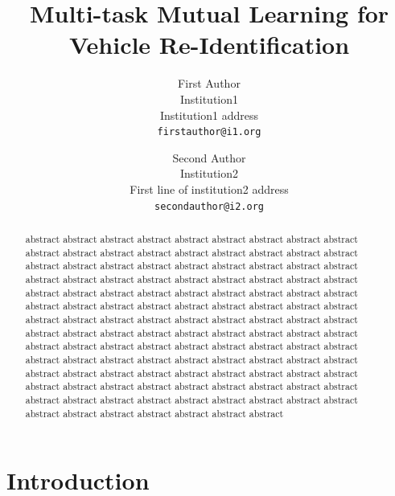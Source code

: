 \documentclass[10pt,twocolumn,letterpaper]{article}
\begin{document}
\title{Multi-task Mutual Learning for Vehicle Re-Identification}

\author{First Author\\
Institution1\\
Institution1 address\\
{\tt\small firstauthor@i1.org}
\and
Second Author\\
Institution2\\
First line of institution2 address\\
{\tt\small secondauthor@i2.org}
}

\maketitle

\begin{abstract}
  abstract  abstract  abstract  abstract  abstract  abstract  abstract  abstract  abstract  abstract  abstract  abstract  abstract  abstract  abstract  abstract  abstract  abstract  abstract  abstract  abstract  abstract  abstract  abstract  abstract  abstract  abstract  abstract  abstract  abstract  abstract  abstract  abstract  abstract  abstract  abstract  abstract  abstract  abstract  abstract  abstract  abstract  abstract  abstract  abstract  abstract  abstract  abstract  abstract  abstract  abstract  abstract  abstract  abstract  abstract  abstract  abstract  abstract  abstract  abstract  abstract  abstract  abstract  abstract  abstract  abstract  abstract  abstract  abstract  abstract  abstract  abstract  abstract  abstract  abstract  abstract  abstract  abstract  abstract  abstract  abstract  abstract  abstract  abstract  abstract  abstract  abstract  abstract  abstract  abstract  abstract  abstract  abstract  abstract  abstract  abstract  abstract  abstract  abstract  abstract  abstract  abstract  abstract  abstract  abstract  abstract  abstract  abstract  abstract  abstract  abstract  abstract  abstract  abstract  abstract  abstract  abstract  abstract  abstract  abstract  abstract  abstract  abstract  abstract
\end{abstract}

\section{Introduction}
\end{document}
